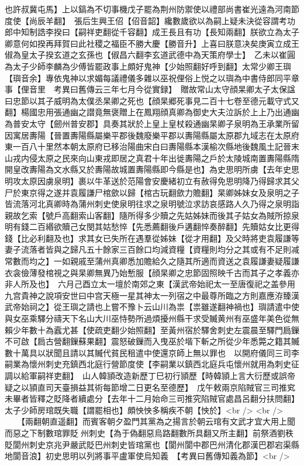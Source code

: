 也許叔冀屯馬】上以鎬為不切事機戊子罷為荆州防禦使以禮部尚書崔光遠為河南節度使【尚辰羊翻】　張后生興王佋【佋音韶】纔數歲欲以為嗣上疑未決從容謂考功郎中知制誥李揆曰【嗣祥吏翻從千容翻】成王長且有功【長知兩翻】朕欲立為太子卿意何如揆再拜賀曰此社稷之福臣不勝大慶【勝音升】上喜曰朕意决矣庚寅立成王俶為皇太子揆玄道之玄孫也【俶昌六翻李玄道武德中為天策府學士】　乙未以崔圓為太子少師李麟為少傅皆罷政事上頗好鬼神【少始照翻好呼到翻】太常少卿王璵【璵音余】專依鬼神以求媚每議禮儀多雜以巫祝俚俗上悦之以璵為中書侍郎同平章事【俚音里　考異曰舊傳云三年七月今從實録】　贈故常山太守顔杲卿太子太保諡曰忠節以其子威明為太僕丞杲卿之死也【顔杲郷死事見二百十七卷至德元載守式又翻】楊國忠用張通幽之譛竟無褒贈上在鳳翔顔真卿為御史大夫泣訴於上上乃出通幽為普安太守【劒州普安郡】具奏其狀於上皇上皇杖殺通幽杲卿子泉明為王承業所留因寓居夀陽【晉置夀陽縣屬樂平郡後魏廢樂平郡以夀陽縣屬太原郡九域志在太原府東一百八十里然本朝太原府已移治陽曲宋白曰夀陽縣本漢榆次縣地後魏風土記晉末山戎内侵太原之民來向山東戎即居之真君十年出徙夀陽之戶於太陵城南置夀陽縣隋開皇改夀陽為文水縣又於夀陽故城置夀陽縣即今縣是也】為史思明所虜【去年史思明攻太原因虜泉明】裹以牛革送於范陽會安慶緒初立有赦得免思明降乃得歸求其父尸於東京得之遂并袁履謙尸棺歛以歸【棺古玩翻歛力贍翻】杲卿姊妹女及泉明之子皆流落河北真卿時為蒲州刺史使泉明往求之泉明號泣求訪哀感路人久乃得之泉明詣親故乞索【號戶高翻索山客翻】隨所得多少贖之先姑姊妹而後其子姑女為賊所掠泉明有錢二百緡欲贖己女閔其姑愁悴【先悉薦翻後戶遘翻悴奏醉翻】先贖姑女比更得錢【比必利翻及也】求其女已失所在遇羣從姊妹【從才用翻】及父時將吏袁履謙等妻子流落者皆與之歸凡五十餘家三百餘口均減資糧【資糧則均分之其或有不足則减常數而均之】一如親戚至蒲州真卿悉加贍給久之隨其所適而資送之袁履謙妻疑履謙衣衾儉薄發棺視之與杲卿無異乃始慙服【顔杲卿之忠節固照映千古而其子之孝義亦非人所及也】　六月己酉立太一壇於南郊之東【漢武帝始祀太一至唐復祀之盖參用九宫貴神之說項安世曰中宫天極一星其神太一列宿之中最尊所臨之方則嘉應洊臻漢武帝始祠之】從王璵之請也上嘗不豫卜云山川為祟【祟雖遂翻神禍也】璵請遣中使與女巫乘驛分禱天下名山大川巫恃勢所過煩擾州縣干求受贓黄州有巫盛年美色從無賴少年數十為蠧尤甚【使疏吏翻少始照翻】至黃州宿於驛舍刺史左震晨至驛門扃鏁不可啟【扃古營翻鏁蘇果翻】震怒破鏁而入曳巫於堦下斬之所從少年悉斃之籍其贓數十萬具以狀聞且請以其贓代貧民租遣中使還京師上無以罪也　以開府儀同三司李嗣業為懷州刺史充鎮西北庭行營節度使【李嗣業以鎮西北庭兵屯懷州就用為刺史征調以給軍嗣祥吏翻】　山人韓頴改造新歷丁巳初行頴歷【時韓頴上言大衍歷或誤帝疑之以頴直司天臺損益其術每節增二日更名至德歷】　戊午敕兩京陷賊官三司推䆒未畢者皆釋之貶降者續處分【去年十二月始命三司推究陷賊官處昌呂翻分扶問翻】太子少師房琯既失職【謂罷相也】頗怏怏多稱疾不朝【怏於】<br />
<br />
　　【兩翻朝直遥翻】而賓客朝夕盈門其黨為之揚言於朝云琯有文武才宜大用上聞而惡之下制數琯罪貶州刺史【為于偽翻惡烏路翻數所具翻又所主翻】前祭酒劉秩貶閬州刺史京兆尹嚴武貶巴州刺史皆琯黨也【閬州閬中郡巴州清化郡漢巴郡宕渠縣地閬音浪】初史思明以列將事平盧軍使烏知義　【考異曰舊傳知義為節】<br />
